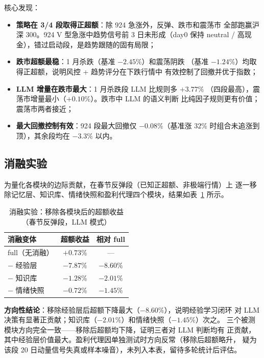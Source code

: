 \documentclass[a4paper,11pt]{article}
\begin{document}
核心发现：
\begin{itemize}
    \item \textbf{策略在 3/4 段取得正超额}：除 924 急涨外，反弹、跌市和震荡市
    全部跑赢沪深 300。924 V 型急涨中趋势信号前 3 日未形成（day0 保持
    neutral / 高现金），错过启动段，是趋势跟随的固有局限；
    \item \textbf{跌市超额最稳}：1 月杀跌（基准 $-2.45\%$）和震荡阴跌
    （基准 $-1.24\%$）均取得正超额，说明风控 + 趋势评分在下跌行情中
    有效控制了回撤并优于指数；
    \item \textbf{LLM 增量在跌市最大}：1 月杀跌段 LLM 比规则多 $+3.77\%$
    （四段最高），震荡市增量最小（$+0.10\%$）。跌市中 LLM 的语义判断
    比纯因子规则更有价值；震荡市两者接近；
    \item \textbf{最大回撤控制有效}：924 段最大回撤仅 $-0.08\%$（基准涨 $32\%$
    时组合未追涨到顶），其余段均在 $-3.3\%$ 以内。
\end{itemize}

\subsection{消融实验}

为量化各模块的边际贡献，在春节反弹段（已知正超额、非极端行情）上
逐一移除记忆层、知识库、情绪快照和盈利代理四个模块，结果如表~\ref{tab:ablation} 所示。

\begin{table}[H]
\centering
\caption{消融实验：移除各模块后的超额收益（春节反弹段，LLM 模式）}
\begin{tabular}{lcc}
\toprule
消融变体 & 超额收益 & 相对 full \\
\midrule
full（无消融） & $+0.73\%$ & — \\
$-$ 经验层 & $-7.87\%$ & $\mathbf{-8.60\%}$ \\
$-$ 知识库 & $-1.28\%$ & $-2.01\%$ \\
$-$ 情绪快照 & $-0.72\%$ & $-1.45\%$ \\
\bottomrule
\end{tabular}
\label{tab:ablation}
\end{table}

\textbf{方向性结论}：移除经验层后超额下降最大（$-8.60\%$），说明经验学习闭环
对 LLM 决策有显著正贡献；知识库（$-2.01\%$）和情绪快照（$-1.45\%$）次之。
三个被测模块方向完全一致——移除后超额均下降，证明三者对 LLM 判断均有
正贡献，其中经验层价值最大。盈利代理因单独测试时方向反常（移除后超额略升，
疑为该段 20 日动量信号失真或样本噪音），未列入本表，留待多轮统计后评估。
\end{document}
